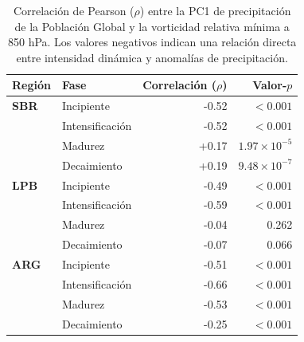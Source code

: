 \begin{table}[htbp]
\centering
\caption[Correlación de Pearson entre PC1 y vorticidad - Población Global]{Correlación de Pearson ($\rho$) entre la PC1 de precipitación de la Población Global y la vorticidad relativa mínima a 850 hPa. Los valores negativos indican una relación directa entre intensidad dinámica y anomalías de precipitación.}
\label{tab:corr_global_tp}
\begin{tabular*}{\textwidth}{@{\extracolsep{\fill}}llrr}
\hline
\textbf{Región} & \textbf{Fase} & \textbf{Correlación ($\rho$)} & \textbf{Valor-$p$} \\
\hline
\textbf{SBR} & Incipiente & -0.52 & $<0.001$ \\
 & Intensificación & -0.52 & $<0.001$ \\
 & Madurez & +0.17 & $1.97\times10^{-5}$ \\
 & Decaimiento & +0.19 & $9.48\times10^{-7}$ \\
\hline
\textbf{LPB} & Incipiente & -0.49 & $<0.001$ \\
 & Intensificación & -0.59 & $<0.001$ \\
 & Madurez & -0.04 & 0.262 \\
 & Decaimiento & -0.07 & 0.066 \\
\hline
\textbf{ARG} & Incipiente & -0.51 & $<0.001$ \\
 & Intensificación & -0.66 & $<0.001$ \\
 & Madurez & -0.53 & $<0.001$ \\
 & Decaimiento & -0.25 & $<0.001$ \\
\hline
\end{tabular*}
\end{table}